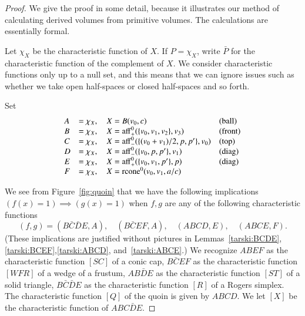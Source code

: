 \begin{proof} We give the proof in some detail, because it illustrates
our method of calculating derived volumes from primitive volumes.
The calculations are essentially formal.

Let $\chi_X$ be the characteristic
function of $X$.  If $P = \chi_X$, write $\bar P$ for the characteristic
function of the complement of $X$.  We consider characteristic functions
only up to a null set, and this means that we can ignore issues such
as whether we take open half-spaces or closed half-spaces and so forth.

Set
$$
\begin{array}{llll}
  A &= \chi_X,\quad X = B(v_0,c)&\text{(ball)}\\
  B &= \chi_X,\quad X = {\operatorname{aff}}_+^0(\{v_0,v_1,v_2\},v_3)&\text{(front)}\\
  C &= \chi_X,\quad X = {\operatorname{aff}}_-^0(\{(v_0+v_1)/2,p,p'\},v_0)
    &\text{(top)}\\
  D &= \chi_X,\quad X = {\operatorname{aff}}_-^0(\{v_0,p,p'\},v_1)&\text{(diag)}\\
  E &= \chi_X,\quad X = {\operatorname{aff}}_+^0(\{v_0,v_1,p'\},p)&\text{(diag)}\\
  F &= \chi_X,\quad X = {\operatorname{rcone}}^0(v_0,v_1,a/c)\\
\end{array}
$$

We see from Figure~\ref{fig:quoin} that we have the following implications
$(f(x)=1)\implies (g(x)=1)$ when $f,g$ are any of the following characteristic
functions
  $$
   (f,g) = (B\bar C \bar D E,A),\quad
   (B\bar C E F,A),\quad (A B C D, E),\quad (A B C E,F).
  $$
(These implications are justified without pictures in Lemmas~\ref{tarski:BCDE},\ref{tarski:BCEF},\ref{tarski:ABCD}, and~\ref{tarski:ABCE}.)
We recognize $ABEF$ as the characteristic function $[SC]$ of a
conic cap, $B\bar C E F$ as the characteristic function $[WFR]$ of a
wedge of a frustum,  $AB\bar D E$ as the characteristic function $[ST]$
of a solid triangle, $B\bar C\bar D E$ as the characteristic function $[R]$
of a Rogers simplex.  The characteristic function $[Q]$
of the quoin is given
by $A B C D$.  We let $[X]$ be the characteristic function of
$A B C \bar D E$.


\end{proof}
